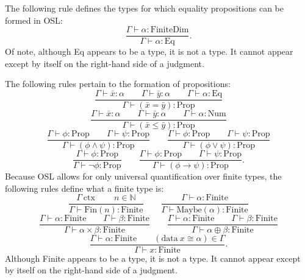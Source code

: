 \documentclass[11pt]{article}
\begin{document}
The following rule defines the types for which
equality propositions can be formed in OSL:
\begin{equation}
	\frac{\Gamma \vdash \alpha : \text{FiniteDim}}
	{\Gamma \vdash \alpha : \text{Eq}}.
\end{equation}
Of note, although Eq appears to be a type, it is not a type.
It cannot appear except by itself on the right-hand side of
a judgment.

The following rules pertain to the formation of propositions:
\begin{equation}
	\frac{\Gamma \vdash \bar{x} : \alpha
	\qquad \Gamma \vdash \bar{y} : \alpha
	\qquad \Gamma \vdash \alpha : \text{Eq}}
	{\Gamma \vdash (\bar{x} = \bar{y}) : \text{Prop}}
\end{equation}
\begin{equation}
	\frac{\Gamma \vdash \bar{x} : \alpha
	\qquad \Gamma \vdash \bar{y} : \alpha
	\qquad \Gamma \vdash \alpha : \text{Num}}
	{\Gamma \vdash (\bar{x} \leq \bar{y}) : \text{Prop}}
\end{equation}
\begin{equation}
	\frac{\Gamma \vdash \phi : \text{Prop}
	\qquad \Gamma \vdash \psi : \text{Prop}}
	{\Gamma \vdash (\phi \wedge \psi) : \text{Prop}}
	\qquad
	\frac{\Gamma \vdash \phi : \text{Prop}
	\qquad \Gamma \vdash \psi : \text{Prop}}
	{\Gamma \vdash (\phi \vee \psi) : \text{Prop}}
\end{equation}
\begin{equation}
	\frac{\Gamma \vdash \phi : \text{Prop}}
	{\Gamma \vdash \neg\phi : \text{Prop}}
	\qquad
	\frac{\Gamma \vdash \phi : \text{Prop}
	\qquad \Gamma \vdash \psi : \text{Prop}}
	{\Gamma \vdash (\phi \to \psi) : \text{Prop}}.
\end{equation}
Because OSL allows for only universal quantification over finite types,
the following rules define what a finite type is:
\begin{equation}
	\frac{\Gamma\ \text{ctx}\ \qquad n \in \mathbb{N}}
	{\Gamma \vdash \text{Fin}(n) : \text{Finite}}
	\qquad
	\frac{\Gamma \vdash \alpha : \text{Finite}}
	{\Gamma \vdash \text{Maybe}(\alpha) : \text{Finite}}
\end{equation}
\begin{equation}
	\frac{\Gamma \vdash \alpha : \text{Finite}
	\qquad \Gamma \vdash \beta : \text{Finite}}
	{\Gamma \vdash \alpha \times \beta : \text{Finite}}
	\qquad
	\frac{\Gamma \vdash \alpha : \text{Finite}
	\qquad \Gamma \vdash \beta : \text{Finite}}
	{\Gamma \vdash \alpha \oplus \beta : \text{Finite}}
\end{equation}
\begin{equation}
	\frac{\Gamma \vdash \alpha : \text{Finite}
	\qquad (\text{data}\ x \cong \alpha) \in \Gamma}
	{\Gamma \vdash x : \text{Finite}}.
\end{equation}
Although Finite appears to be a type, it is not a type.
It cannot appear except by itself on the right-hand side
of a judgment.
\end{document}
